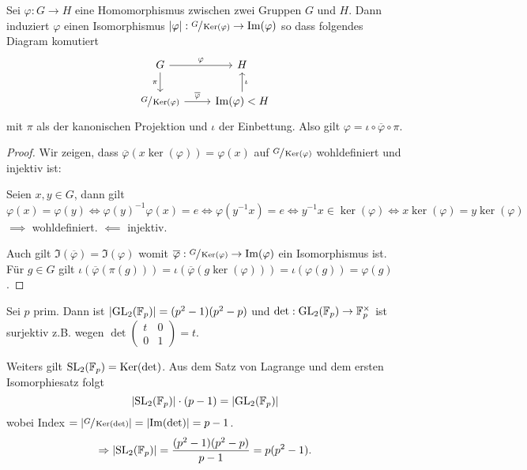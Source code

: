 \begin{theorem}
	Sei $\varphi: G \to H$ eine Homomorphismus zwischen zwei Gruppen $G$ und $H$.
	Dann induziert $\varphi$ einen Isomorphismus $\abs{\varphi}: \sfrac{G}{\operatorname{Ker}(\varphi)} \to  \Im(\varphi)$ so dass 
	folgendes Diagram komutiert
	\[
	\begin{tikzcd}
		G \arrow[d, "\pi"'] \arrow[r, "\varphi"]                 & H                                    \\
	\sfrac{G}{\ker(\varphi)} \arrow[r, "\overline{\varphi}"] & \Im(\varphi) < H \arrow[u, "\iota"']
		\end{tikzcd}
	\] 
	mit $\pi$ als der kanonischen Projektion und $\iota$ der Einbettung.
	Also gilt $\varphi = \iota \circ \overline{\varphi} \circ \pi$.
\end{theorem}

\begin{proof}
	Wir zeigen, dass $\overline{\varphi}(x \ker(\varphi)) = \varphi(x)$ auf $\sfrac{G}{\operatorname{Ker}(\varphi)}$ wohldefiniert und injektiv ist:

	Seien $x,y \in G$, dann gilt 
	\[
		\varphi(x) = \varphi(y) \Leftrightarrow \varphi(y)^{-1} \varphi(x) = e \Leftrightarrow \varphi(y^{-1} x) = e \Leftrightarrow y^{-1} x \in \ker(\varphi) \Leftrightarrow
		x \ker(\varphi) = y \ker(\varphi)
	\]
	$\implies$ wohldefiniert. $\impliedby$ injektiv.

	Auch gilt $\Im(\overline{\varphi}) = \Im(\varphi)$ womit $\overline{\varphi}: \sfrac{G}{\operatorname{Ker}(\varphi)} \to \Im(\varphi)$ ein Isomorphismus ist.
	Für $g \in G$ gilt $\iota(\overline{\varphi}(\pi(g))) = \iota(\overline{\varphi}(g \ker(\varphi))) = \iota(\varphi(g)) = \varphi(g)$.
\end{proof}

\begin{eg}
	Sei $p$ prim. Dann ist $\abs{\operatorname{GL}_{2}(\mathbb{F}_{p})} = (p^2 -1)(p^2 - p)$ und 
	$\det: \operatorname{GL}_{2}(\mathbb{F}_{p}) \to \mathbb{F}_{p}^{\times}$ ist surjektiv z.B. wegen $\det\begin{pmatrix} 
		t & 0\\ 0 & 1
	\end{pmatrix} = t$. 

	Weiters gilt $\operatorname{SL}_2(\mathbb{F}_{p}) = \operatorname{Ker}(\det)$. Aus dem Satz von Lagrange und dem ersten Isomorphiesatz folgt
	\[
		\abs{\operatorname{SL}_2(\mathbb{F}_{p})} \cdot (p-1) = \abs{\operatorname{GL}_2(\mathbb{F}_{p})}
	\]
	wobei Index $= \abs{\sfrac{G}{\operatorname{Ker}(\det)}} = \abs{\Im(\det)} = p-1$.
	\[
		\Rightarrow \abs{\operatorname{SL}_2(\mathbb{F}_{p})} = \frac{(p^2-1)(p^2-p)}{p-1} = p (p^2-1)
	.\] 
\end{eg}

